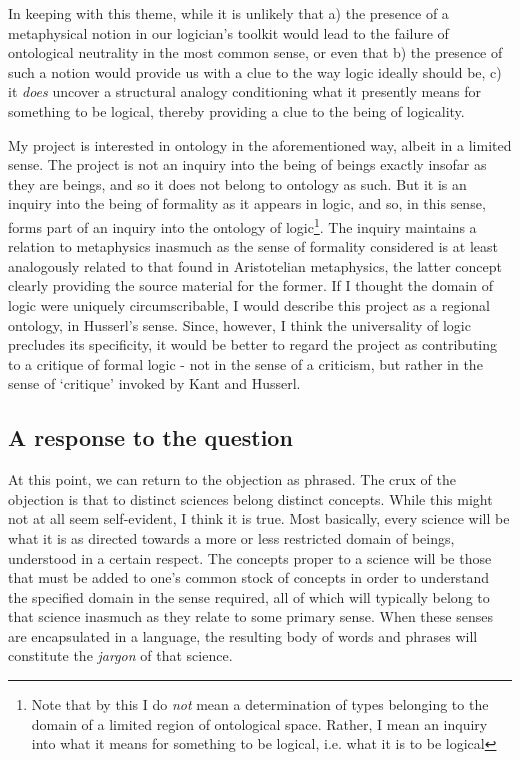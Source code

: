 \documentclass[]{article}
\begin{document}
In keeping with this theme, while it is unlikely that a) the presence of a metaphysical notion in our logician's toolkit would lead to the failure of ontological neutrality in the most common sense, or even that b) the presence of such a notion would provide us with a clue to the way logic ideally should be, c) it \textit{does} uncover a structural analogy conditioning what it presently means for something to be logical, thereby providing a clue to the being of logicality.

My project is interested in ontology in the aforementioned way, albeit in a limited sense. The project is not an inquiry into the being of beings exactly insofar as they are beings, and so it does not belong to ontology as such. But it is an inquiry into the being of formality as it appears in logic, and so, in this sense, forms part of an inquiry into the ontology of logic\footnote{Note that by this I do \textit{not} mean a determination of types belonging to the domain of a limited region of ontological space. Rather, I mean an inquiry into what it means for something to be logical, i.e. what it is to be logical}. The inquiry maintains a relation to metaphysics inasmuch as the sense of formality considered is at least analogously related to that found in Aristotelian metaphysics, the latter concept clearly providing the source material for the former. If I thought the domain of logic were uniquely circumscribable, I would describe this project as a regional ontology, in Husserl's sense. Since, however, I think the universality of logic precludes its specificity, it would be better to regard the project as contributing to a critique of formal logic - not in the sense of a criticism, but rather in the sense of `critique' invoked by Kant and Husserl.

\subsection{A response to the question}

At this point, we can return to the objection as phrased. The crux of the objection is that to distinct sciences belong distinct concepts. While this might not at all seem self-evident, I think it is true. Most basically, every science will be what it is as directed towards a more or less restricted domain of beings, understood in a certain respect. The concepts proper to a science will be those that must be added to one's common stock of concepts in order to understand the specified domain in the sense required, all of which will typically belong to that science inasmuch as they relate to some primary sense. When these senses are encapsulated in a language, the resulting body of words and phrases will constitute the \textit{jargon} of that science. 
\end{document}
